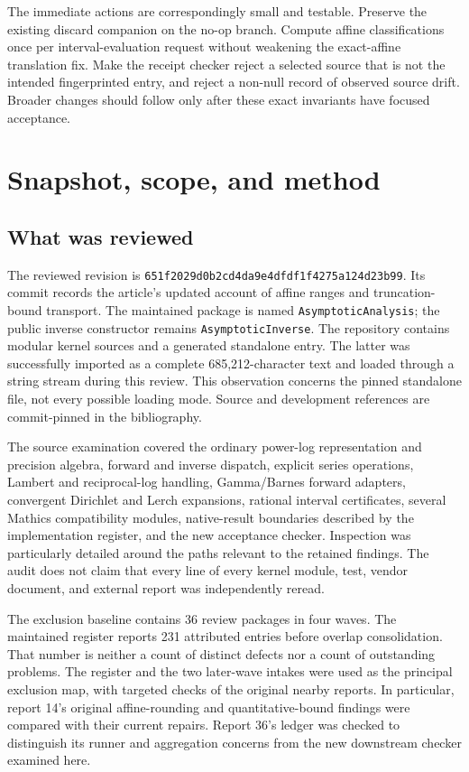 \documentclass[11pt,letterpaper]{article}
\newcommand{\prop}[1]{\texttt{#1}}
\newcommand{\pin}{651f2029d0b2cd4da9e4dfdf1f4275a124d23b99}
\begin{document}
The immediate actions are correspondingly small and testable. Preserve the
existing discard companion on the no-op branch. Compute affine classifications
once per interval-evaluation request without weakening the exact-affine
translation fix. Make the receipt checker reject a selected source that is not
the intended fingerprinted entry, and reject a non-null record of observed
source drift. Broader changes should follow only after these exact invariants
have focused acceptance.

\section{Snapshot, scope, and method}
\label{sec:scope}

\subsection{What was reviewed}

The reviewed revision is \texttt{\pin}. Its commit records the article's updated
account of affine ranges and truncation-bound transport. The maintained package
is named \prop{AsymptoticAnalysis}; the public inverse constructor remains
\prop{AsymptoticInverse}. The repository contains modular kernel sources and a
generated standalone entry. The latter was successfully imported as a complete
685,212-character text and loaded through a string stream during this review.
This observation concerns the pinned standalone file, not every possible loading
mode. Source and development references are commit-pinned in the bibliography.
\cite{repo,core,status}

The source examination covered the ordinary power-log representation and
precision algebra, forward and inverse dispatch, explicit series operations,
Lambert and reciprocal-log handling, Gamma/Barnes forward adapters, convergent
Dirichlet and Lerch expansions, rational interval certificates, several Mathics
compatibility modules, native-result boundaries described by the implementation
register, and the new acceptance checker. Inspection was particularly detailed
around the paths relevant to the retained findings. The audit does not claim that
every line of every kernel module, test, vendor document, and external report was
independently reread.

The exclusion baseline contains 36 review packages in four waves. The maintained
register reports 231 attributed entries before overlap consolidation. That number
is neither a count of distinct defects nor a count of outstanding problems.
The register and the two later-wave intakes were used as the principal exclusion
map, with targeted checks of the original nearby reports. In particular, report
14's original affine-rounding and quantitative-bound findings were compared with
their current repairs. Report 36's ledger was checked to distinguish its runner
and aggregation concerns from the new downstream checker examined here.
\cite{reviews,status,w3,w4,r14,r36}
\end{document}
